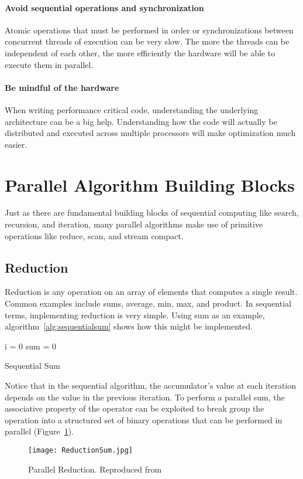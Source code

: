 \paragraph{Avoid sequential operations and synchronization}
Atomic operations that must be performed in order or synchronizations between concurrent threads of execution can be very slow. The more the threads can be independent of each other, the more efficiently the hardware will be able to execute them in parallel.
\paragraph{Be mindful of the hardware}
When writing performance critical code, understanding the underlying architecture can be a big help. Understanding how the code will actually be distributed and executed across multiple processors will make optimization much easier.

\section{Parallel Algorithm Building Blocks}
Just as there are fundamental building blocks of sequential computing like search, recursion, and iteration, many parallel algorithms make use of primitive operations like reduce, scan, and stream compact.
\subsection{Reduction}
Reduction is any operation on an array of elements that computes a single result. Common examples include sums, average, min, max, and product. In sequential terms, implementing reduction is very simple. Using sum as an example, algorithm~\ref{alg:sequentialsum} shows how this might be implemented.\\
\begin{algorithm}[H]
\label{alg:sequentialsum}
 \singlespacing
 i = 0\;
 sum = 0\;
 \caption{Sequential Sum}
\end{algorithm}

Notice that in the sequential algorithm, the accumulator's value at each iteration depends on the value in the previous iteration. To perform a parallel sum, the associative property of the operator can be exploited to break group the operation into a structured set of binary operations that can be performed in parallel (Figure~\ref{fig:reductionsum}).
\begin{figure}[ht]
    \centering
    \texttt{[image: ReductionSum.jpg]}
    \caption{Parallel Reduction. Reproduced from\cite{nguyen2007gpu}}
    \label{fig:reductionsum}
\end{figure}

